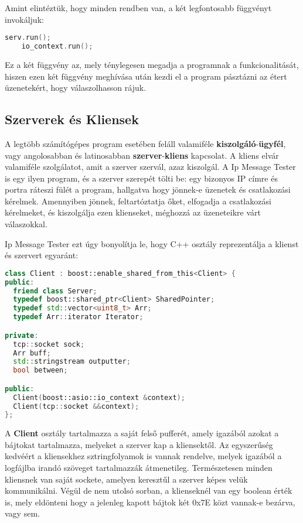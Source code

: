 \documentclass[openany,10pt,a4paper]{book}
\begin{document}
Amint elintéztük, hogy minden rendben van, a két legfontosabb függvényt invokáljuk:

\begin{lstlisting}[language=C++]
    serv.run();
    io_context.run();
\end{lstlisting}

Ez a két függvény az, mely ténylegesen megadja a programnak a funkcionalitását, hiszen ezen két függvény meghívása után kezdi el a program pásztázni az étert üzenetekért, hogy válaszolhasson rájuk.

\subsection{Szerverek és Kliensek}

A legtöbb számítógépes program esetében feláll valamiféle \textbf{kiszolgáló}-\textbf{ügyfél}, vagy angolosabban és latinosabban \textbf{szerver}-\textbf{kliens} kapcsolat. A kliens elvár valamiféle szolgálatot, amit a szerver szervál, azaz kiszolgál. A Ip Message Tester is egy ilyen program, és a szerver szerepét tölti be: egy bizonyos IP címre és portra ráteszi fülét a program, hallgatva hogy jönnek-e üzenetek és csatlakozási kérelmek. Amennyiben jönnek, feltartóztatja őket, elfogadja a csatlakozási kérelmeket, és kiszolgálja ezen klienseket, méghozzá az üzeneteikre várt válaszokkal.

Ip Message Tester ezt úgy bonyolítja le, hogy C++ osztály reprezentálja a klienst és szervert egyaránt:

\begin{lstlisting}[language=C++]
class Client : boost::enable_shared_from_this<Client> {
public:
  friend class Server;
  typedef boost::shared_ptr<Client> SharedPointer;
  typedef std::vector<uint8_t> Arr;
  typedef Arr::iterator Iterator;

private:
  tcp::socket sock;
  Arr buff;
  std::stringstream outputter;
  bool between;

public:
  Client(boost::asio::io_context &context);
  Client(tcp::socket &&context);
};
\end{lstlisting}

A \textbf{Client} osztály tartalmazza a saját felső pufferét, amely igazából azokat a bájtokat tartalmazza, melyeket a szerver kap a kliensektől. Az egyszerűség kedvéért a kliensekhez sztringfolyamok is vannak rendelve, melyek igazából a logfájlba irandó szöveget tartalmazzák átmenetileg. Természetesen minden kliensnek van saját sockete, amelyen keresztűl a szerver képes velük kommunikálni. Végül de nem utolsó sorban, a klienseknél van egy boolean érték is, mely eldönteni hogy a jelenleg kapott bájtok két 0x7E közt vannak-e bezárva, vagy sem.
\end{document}
